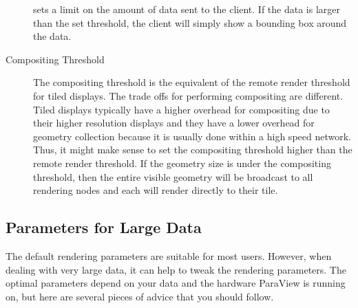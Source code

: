 \begin{description}
  sets a limit on the amount of data sent to the client.  If the data is
  larger than the set threshold, the client will simply show a bounding box
  around the data.
\item[Compositing Threshold]  The compositing
  threshold is the equivalent of the remote render threshold for tiled
  displays.  The trade offs for performing compositing are different.
  Tiled displays typically have a higher overhead for compositing due to
  their higher resolution displays and they have a lower overhead for
  geometry collection because it is usually done within a high speed
  network.  Thus, it might make sense to set the compositing threshold
  higher than the remote render threshold.  If the geometry size is under
  the compositing threshold, then the entire visible geometry will be
  broadcast to all rendering nodes and each will render directly to their
  tile.
\end{description}

\subsection{Parameters for Large Data}

The default rendering parameters are suitable for most users.  However,
when dealing with very large data, it can help to tweak the rendering
parameters.  The optimal parameters depend on your data and the hardware
ParaView is running on, but here are several pieces of advice that you
should follow.

